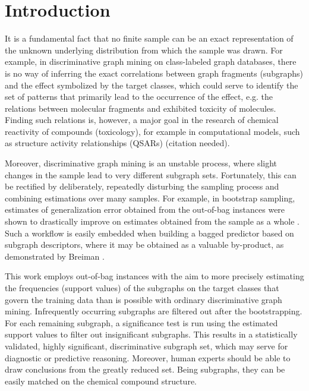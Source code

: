 \documentclass{article}
\begin{document}
\section{Introduction}
It is a fundamental fact that no finite sample can be an exact representation
of the unknown underlying distribution from which the sample was drawn.  For
example, in discriminative graph mining on class-labeled graph databases,
there is no way of inferring the exact correlations between graph fragments
(subgraphs) and the effect symbolized by the target classes, which could serve
to identify the set of patterns that primarily lead to the occurrence of the
effect, e.g. the relations between molecular fragments and exhibited toxicity
of molecules. Finding such relations is, however, a major goal in the research
of chemical reactivity of compounds (toxicology), for example in computational
models, such as structure activity relationships (QSARs) (citation needed).

Moreover, discriminative graph mining is an unstable process, where slight
changes in the sample lead to very different subgraph sets. Fortunately, this
can be rectified by deliberately, repeatedly disturbing the sampling process
and combining estimations over many samples. For example, in bootstrap
sampling, estimates of generalization error obtained from the out-of-bag
instances were shown to drastically improve on estimates obtained from the
sample as a whole \cite{bylander02estimating, breiman96oob}. Such a workflow is
easily embedded when building a bagged predictor based on subgraph descriptors,
where it may be obtained as a valuable by-product, as demonstrated by Breiman
\cite{breiman96oob}.

This work employs out-of-bag instances with the aim to more precisely
estimating the frequencies (support values) of the subgraphs on the target
classes that govern the training data than is possible with ordinary
discriminative graph mining. Infrequently occurring subgraphs are filtered out
after the bootstrapping.  For each remaining subgraph, a significance test is
run using the estimated support values to filter out insignificant subgraphs.
This results in a statistically validated, highly significant, discriminative
subgraph set, which may serve for diagnostic or predictive reasoning. Moreover,
human experts should be able to draw conclusions from the greatly reduced set.
Being subgraphs, they can be easily matched on the chemical compound structure.
\end{document}
